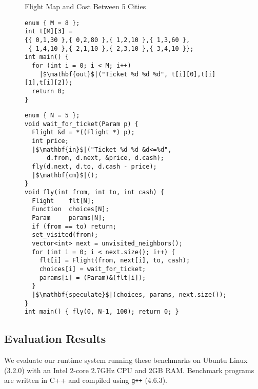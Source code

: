 \begin{figure}[th]
  \centering
  \caption{Flight Map and Cost Between 5 Cities}
  \label{fig:flight}
\end{figure}

\begin{figure}[th]
\begin{lstlisting}[label=lst:tsell,caption=Ticket Seller's Agent]
enum { M = 8 };
int t[M][3] =
{{ 0,1,30 },{ 0,2,80 },{ 1,2,10 },{ 1,3,60 },
 { 1,4,10 },{ 2,1,10 },{ 2,3,10 },{ 3,4,10 }};
int main() {
  for (int i = 0; i < M; i++)
    |$\mathbf{out}$|("Ticket %d %d %d", t[i][0],t[i][1],t[i][2]);
  return 0;
}
\end{lstlisting}

\begin{lstlisting}[label=lst:tbuy,caption=Ticket Buyer's Agent]
enum { N = 5 };
void wait_for_ticket(Param p) {
  Flight &d = *((Flight *) p);
  int price;
  |$\mathbf{in}$|("Ticket %d %d &d<=%d",
      d.from, d.next, &price, d.cash);
  fly(d.next, d.to, d.cash - price);
  |$\mathbf{cm}$|();
}
void fly(int from, int to, int cash) {
  Flight    flt[N];
  Function  choices[N];
  Param     params[N];
  if (from == to) return;
  set_visited(from);
  vector<int> next = unvisited_neighbors();
  for (int i = 0; i < next.size(); i++) {
    flt[i] = Flight(from, next[i], to, cash);
    choices[i] = wait_for_ticket;
    params[i] = (Param)&(flt[i]);
  }
  |$\mathbf{speculate}$|(choices, params, next.size());
}
int main() { fly(0, N-1, 100); return 0; }
\end{lstlisting}
\end{figure}

\subsection{Evaluation Results}

We evaluate our runtime system running these benchmarks
on Ubuntu Linux (3.2.0) with an Intel 2-core 2.7GHz CPU and 2GB RAM.
Benchmark programs are written in C++ and compiled using \texttt{g++} (4.6.3).

